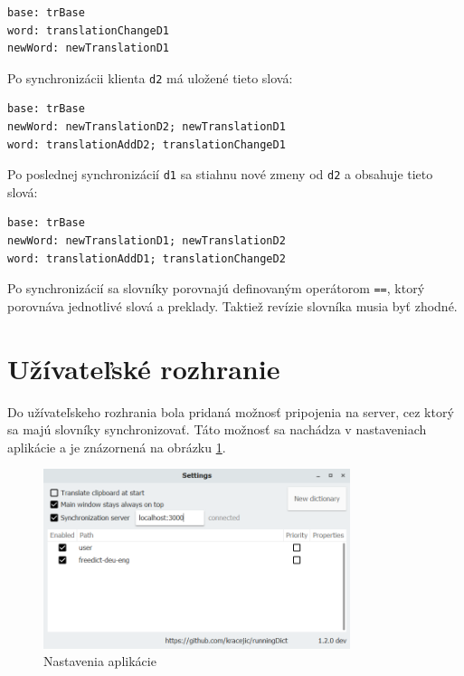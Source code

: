 \documentclass[
  digital, %
  table,   %
  lof,     %
  lot,     %
]{fithesis3}
\begin{document}
\begin{lstlisting}[basicstyle=\small]
base: trBase
word: translationChangeD1
newWord: newTranslationD1
\end{lstlisting}

Po synchronizácii klienta \texttt{d2} má uložené tieto slová:

\begin{lstlisting}[basicstyle=\small]
base: trBase
newWord: newTranslationD2; newTranslationD1
word: translationAddD2; translationChangeD1
\end{lstlisting}

Po poslednej synchronizácií \texttt{d1} sa stiahnu nové zmeny od \texttt{d2} a obsahuje tieto slová:

\begin{lstlisting}[basicstyle=\small]
base: trBase
newWord: newTranslationD1; newTranslationD2
word: translationAddD1; translationChangeD2
\end{lstlisting}

Po synchronizácií sa slovníky porovnajú definovaným operátorom \texttt{==}, ktorý porovnáva jednotlivé slová a preklady. Taktiež revízie slovníka musia byť zhodné.

\section{Užívateľské rozhranie}
Do užívateľskeho rozhrania bola pridaná možnosť pripojenia na server, cez ktorý sa majú slovníky synchronizovať. Táto možnosť sa nachádza v nastaveniach aplikácie a je znázornená na obrázku \ref{fig:desktop-settings}.
\begin{figure}
	\begin{center}
	\includegraphics[width=0.8\textwidth]{img/desktop-settings.png}
	\end{center}
    \caption{Nastavenia aplikácie}
	\label{fig:desktop-settings}
\end{figure}
\end{document}
